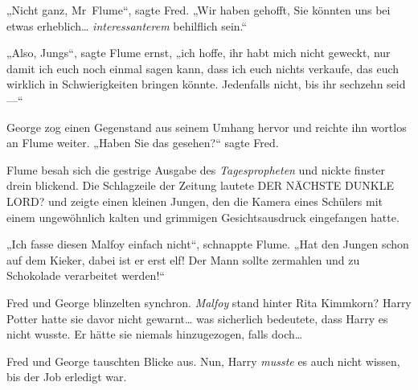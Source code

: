 „Nicht ganz, Mr~Flume“, sagte Fred. „Wir haben gehofft, Sie könnten uns bei etwas erheblich… \emph{interessanterem} behilflich sein.“

„Also, Jungs“, sagte Flume ernst, „ich hoffe, ihr habt mich nicht geweckt, nur damit ich euch noch einmal sagen kann, dass ich euch nichts verkaufe, das euch wirklich in Schwierigkeiten bringen könnte. Jedenfalls nicht, bis ihr sechzehn seid—“

George zog einen Gegenstand aus seinem Umhang hervor und reichte ihn wortlos an Flume weiter. „Haben Sie das gesehen?“ sagte Fred.

Flume besah sich die gestrige Ausgabe des \emph{Tagespropheten} und nickte finster drein blickend. Die Schlagzeile der Zeitung lautete DER NÄCHSTE DUNKLE LORD? und zeigte einen kleinen Jungen, den die Kamera eines Schülers mit einem ungewöhnlich kalten und grimmigen Gesichtsausdruck eingefangen hatte.

„Ich fasse diesen Malfoy einfach nicht“, schnappte Flume. „Hat den Jungen schon auf dem Kieker, dabei ist er erst elf! Der Mann sollte zermahlen und zu Schokolade verarbeitet werden!“

Fred und George blinzelten synchron. \emph{Malfoy} stand hinter Rita Kimmkorn? Harry Potter hatte sie davor nicht gewarnt… was sicherlich bedeutete, dass Harry es nicht wusste. Er hätte sie niemals hinzugezogen, falls doch…

Fred und George tauschten Blicke aus. Nun, Harry \emph{musste} es auch nicht wissen, bis der Job erledigt war.


